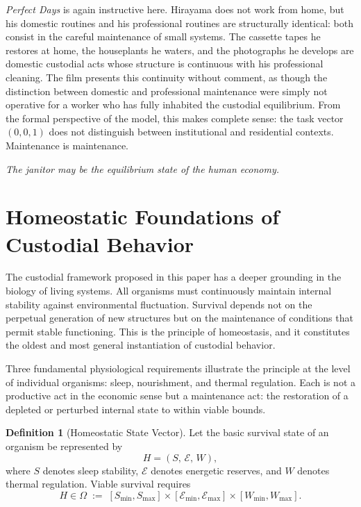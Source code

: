 \documentclass[12pt,a4paper]{article}
\theoremstyle{plain}
\theoremstyle{definition}
\newtheorem{definition}[theorem]{Definition}
\theoremstyle{remark}
\begin{document}
\emph{Perfect Days} is again instructive here.  Hirayama does not work from
home, but his domestic routines and his professional routines are
structurally identical: both consist in the careful maintenance of small
systems.  The cassette tapes he restores at home, the houseplants he waters,
and the photographs he develops are domestic custodial acts whose structure
is continuous with his professional cleaning.  The film presents this
continuity without comment, as though the distinction between domestic and
professional maintenance were simply not operative for a worker who has fully
inhabited the custodial equilibrium.  From the formal perspective of the
model, this makes complete sense: the task vector $(0,0,1)$ does not
distinguish between institutional and residential contexts.  Maintenance is
maintenance.

\bigskip
\begin{center}
\textit{The janitor may be the equilibrium state of the human economy.}
\end{center}


\section{Homeostatic Foundations of Custodial Behavior}
\label{sec:homeostasis}

The custodial framework proposed in this paper has a deeper grounding in
the biology of living systems.  All organisms must continuously maintain
internal stability against environmental fluctuation.  Survival depends not
on the perpetual generation of new structures but on the maintenance of
conditions that permit stable functioning.  This is the principle of
homeostasis, and it constitutes the oldest and most general instantiation
of custodial behavior.

Three fundamental physiological requirements illustrate the principle at
the level of individual organisms: sleep, nourishment, and thermal
regulation.  Each is not a productive act in the economic sense but a
maintenance act: the restoration of a depleted or perturbed internal state
to within viable bounds.

\begin{definition}[Homeostatic State Vector]
Let the basic survival state of an organism be represented by
\[
H = (S,\, \mathcal{E},\, W),
\]
where $S$ denotes sleep stability, $\mathcal{E}$ denotes energetic
reserves, and $W$ denotes thermal regulation.  Viable survival requires
\[
H \in \Omega \;:=\;
[S_{\min},S_{\max}]
\times
[\mathcal{E}_{\min},\mathcal{E}_{\max}]
\times
[W_{\min},W_{\max}].
\]
\end{definition}
\end{document}
